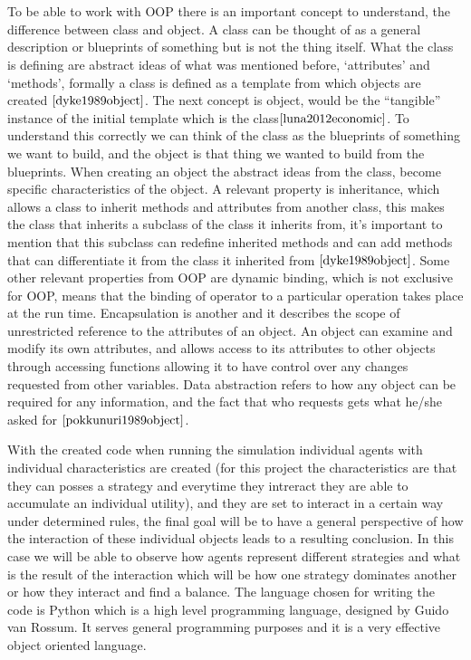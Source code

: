 \\\\To be able to work with OOP there is an important concept to understand, the difference between class and object. A class can be thought of as a general description or blueprints of something but is not the thing itself.  What the class is defining are abstract ideas of what was mentioned before, `attributes’ and `methods’, formally a class is defined as a template from which objects are created $\cite{dyke1989object}$. The next concept is object,  would be the ``tangible'' instance of the initial template which is the class$\cite{luna2012economic}$. To understand this correctly we can think of the class as the blueprints of something we want to build, and the object is that thing we wanted to build from the blueprints. When creating an object the abstract ideas from the class, become specific characteristics of the object. A relevant property is inheritance, which allows a class to inherit methods and attributes from another class, this makes the class that inherits a subclass of the class it inherits from, it’s important to mention that this subclass can redefine inherited methods and can add methods that can differentiate it from the class it inherited from $\cite{dyke1989object}$.  Some other relevant properties from OOP are dynamic binding, which is not exclusive for OOP, means that the binding of operator to a particular operation takes place at the run time. Encapsulation is another and it describes the scope of unrestricted reference to the attributes of an object. An object can examine and modify its own attributes, and allows access to its attributes to other objects through accessing functions allowing it to have control over any changes requested from other variables. Data abstraction refers to how any object can be required for any information, and the fact that who requests gets what he/she asked for $\cite{pokkunuri1989object}$. 

With the created code when running the simulation individual agents with individual characteristics are created (for this project the characteristics are that they can posses a strategy and everytime they intreract they are able to accumulate an individual utility), and they are set to interact in a certain way under determined rules, the final goal will be to have a general perspective of how the interaction of these individual objects leads to a resulting conclusion. In this case we will be able to observe how agents represent different strategies and what is the result of the interaction which will be how one strategy dominates another or how they interact and find a balance. The language chosen for writing the code is Python which is a high level programming language, designed by Guido van Rossum. It serves general programming purposes and it is a very effective object oriented language.

